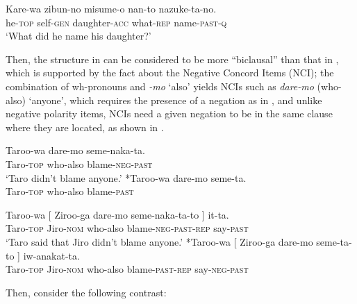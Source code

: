 \documentclass[output=paper]{langsci/langscibook}
\begin{document}
\ea \gll Kare-wa zibun-no misume-o nan-to nazuke-ta-no.\\
he-\textsc{top} self-\textsc{gen} daughter-\textsc{acc} what-\textsc{rep} name-\textsc{past-q}\\
\glt `What did he name his daughter?'
\z

Then, the structure in  can be considered to be more ``biclausal'' than that in , which is supported by the fact about the Negative Concord Items (NCI); the combination of wh-pronouns and \textit{-mo} `also' yields NCIs such as \textit{dare-mo} (who-also) `anyone', which requires the presence of a negation as in , and unlike negative polarity items, NCIs need a given negation to be in the same clause where they are located, as shown in .

\ea\label{shimamu25} \begin{xlist}
\ex \gll Taroo-wa dare-mo seme-naka-ta.\\
Taro-\textsc{top} who-also blame-\textsc{neg-past}\\
\glt `Taro didn't blame anyone.'
\ex  \hspace{-1.5mm}*{\gll Taroo-wa dare-mo seme-ta.\\
Taro-\textsc{top} who-also blame-\textsc{past}\\}
\end{xlist}
\z

\ea\label{shimamu26} \begin{xlist}
\ex \gll Taroo-wa [ Ziroo-ga dare-mo seme-naka-ta-to ] it-ta.\\
Taro-\textsc{top} {} Jiro-\textsc{nom} who-also blame-\textsc{neg-past-rep} {} say-\textsc{past}\\
\glt `Taro said that Jiro didn't blame anyone.'
\ex  \hspace{-1.5mm}*{\gll Taroo-wa [ Ziroo-ga dare-mo seme-ta-to ] iw-anakat-ta.\\
Taro-\textsc{top} {} Jiro-\textsc{nom} who-also blame-\textsc{past-rep} {} say-\textsc{neg-past}\\
}
\end{xlist}
\z
Then, consider the following contrast:
\end{document}

